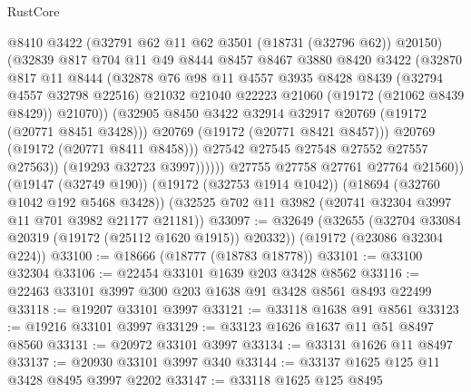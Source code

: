 \begin{lexlean}{RustCore}
\begin{coremodule}
                        @8410
                        @3422
                        (@32791 @62 @11 @62 @3501 (@18731 (@32796 @62)) @20150)
                        (@32839
                          @817
                          @704
                          @11
                          @49
                          @8444
                          @8457
                          @8467
                          @3880
                          @8420
                          @3422
                          (@32870
                            @817
                            @11
                            @8444
                            (@32878
                              @76
                              @98
                              @11
                              @4557
                              @3935
                              @8428
                              @8439
                              (@32794 @4557 @32798 @22516)
                              @21032
                              @21040
                              @22223
                              @21060
                              (@19172 (@21062 @8439 @8429))
                              @21070))
                          (@32905 @8450 @3422 @32914 @32917 @20769 (@19172 (@20771 @8451 @3428)))
                          @20769
                          (@19172 (@20771 @8421 @8457)))
                        @20769
                        (@19172 (@20771 @8411 @8458)))
                      @27542
                      @27545
                      @27548
                      @27552
                      @27557
                      @27563))
                  (@19293 @32723 @3997))))))
        @27755
        @27758
        @27761
        @27764
        @21560))
    (@19147 (@32749 @190))
    (@19172 (@32753 @1914 @1042))
    (@18694 (@32760 @1042 @192 @5468 @3428))
    (@32525 @702 @11 @3982 (@20741 @32304 @3997 @11 @701 @3982 @21177 @21181))
@33097 := @32649
    (@32655 (@32704 @33084 @20319 (@19172 (@25112 @1620 @1915)) @20332))
    (@19172 (@23086 @32304 @224))
@33100 := @18666 (@18777 (@18783 @18778))
@33101 := @33100 @32304
@33106 := @22454 @33101 @1639 @203 @3428 @8562
@33116 := @22463 @33101 @3997 @300 @203 @1638 @91 @3428 @8561 @8493 @22499
@33118 := @19207 @33101 @3997
@33121 := @33118 @1638 @91 @8561
@33123 := @19216 @33101 @3997
@33129 := @33123 @1626 @1637 @11 @51 @8497 @8560
@33131 := @20972 @33101 @3997
@33134 := @33131 @1626 @11 @8497
@33137 := @20930 @33101 @3997 @340
@33144 := @33137 @1625 @125 @11 @3428 @8495 @3997 @2202
@33147 := @33118 @1625 @125 @8495

\end{coremodule}
\end{lexlean}

